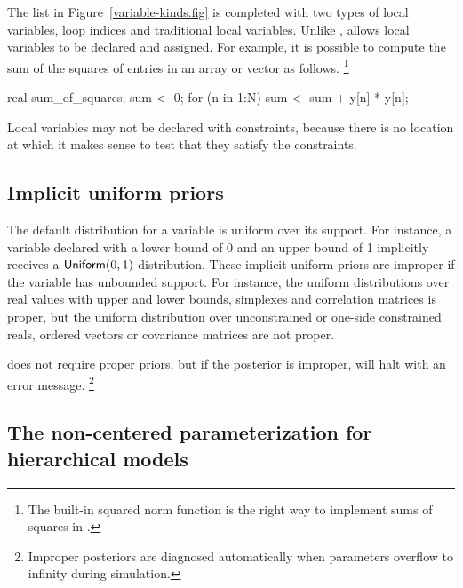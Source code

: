 \documentclass[article]{jss}
\begin{document}
The list in Figure~\ref{variable-kinds.fig} is completed with two
types of local variables, loop indices and traditional local
variables.  Unlike ,  allows local
variables to be declared and assigned.  For example, it is possible to
compute the sum of the squares of entries in an array or vector
 as follows.%
%
\footnote{The built-in squared norm function is the right way to
  implement sums of squares in .}
%
\begin{Code}
{ 
  real sum_of_squares;
  sum <- 0;
  for (n in 1:N)
    sum <- sum + y[n] * y[n];
}  
\end{Code}
%
Local variables may not be declared with constraints, because there is
no location at which it makes sense to test that they satisfy the
constraints. 


\subsection{Implicit uniform priors}\label{implicit-prior.section}

The default distribution for a variable is uniform over its support.
For instance, a variable declared with a lower bound of 0 and an upper
bound of 1 implicitly receives a $\mbox{\sf Uniform}(0,1)$
distribution.  These implicit uniform priors are improper if the
variable has unbounded support.  For instance, the uniform
distributions over real values with upper and lower bounds, simplexes
and correlation matrices is proper, but the uniform distribution over
unconstrained or one-side constrained reals, ordered vectors or
covariance matrices are not proper.

 does not require proper priors, but if the posterior
is improper,  will halt with an error message.%
%
\footnote{Improper posteriors are diagnosed automatically when
  parameters overflow to infinity during simulation.}


\subsection{The non-centered parameterization for hierarchical models}\label{centering.section}
\end{document}
